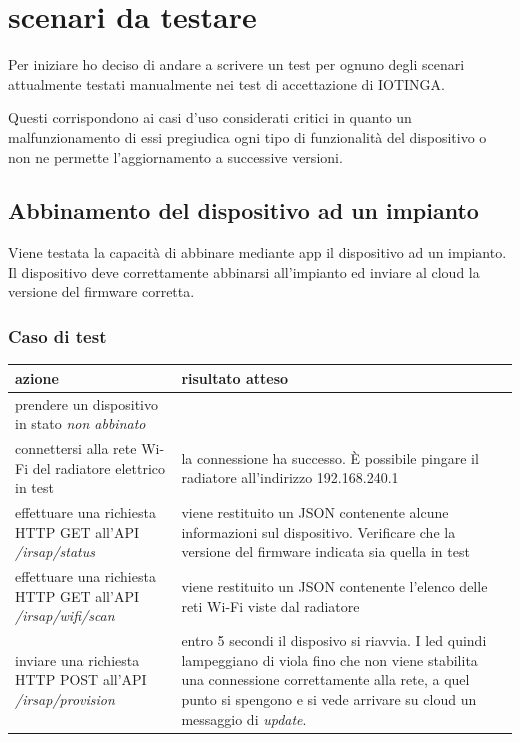 \documentclass[12pt,a4paper,twoside,titlepage]{book}
\begin{document}
\section{scenari da testare}

Per iniziare ho deciso di andare a scrivere un test per ognuno degli scenari attualmente
testati manualmente nei test di accettazione di IOTINGA.

Questi corrispondono ai casi d'uso considerati critici in quanto un malfunzionamento
di essi pregiudica ogni tipo di funzionalità del dispositivo o non ne permette l'aggiornamento
a successive versioni.

\subsection{Abbinamento del dispositivo ad un impianto}

Viene testata la capacità di abbinare mediante app il dispositivo ad un impianto.
Il dispositivo deve correttamente abbinarsi all’impianto ed inviare al cloud la versione
del firmware corretta.

\subsubsection{Caso di test}
\begin{center}
\begin{tabular}{| p{} | p{} |}
    \hline \textbf{azione} & \textbf{risultato atteso} \\
    \hline prendere un dispositivo in stato \textit{non abbinato} & \\
    \hline connettersi alla rete Wi-Fi del radiatore elettrico in test & la connessione ha successo. È possibile pingare il radiatore all'indirizzo 192.168.240.1 \\
    \hline effettuare una richiesta HTTP GET all'API \textit{/irsap/status} & viene restituito un JSON contenente alcune informazioni sul dispositivo. Verificare che la versione del firmware indicata sia quella in test \\
    \hline effettuare una richiesta HTTP GET all'API \textit{/irsap/wifi/scan} & viene restituito un JSON contenente l'elenco delle reti Wi-Fi viste dal radiatore \\
    \hline inviare una richiesta HTTP POST all'API \textit{/irsap/provision} & entro 5 secondi il disposivo si riavvia. I led quindi lampeggiano di viola fino che non viene stabilita una connessione correttamente alla rete, a quel punto si spengono e si vede arrivare su cloud un messaggio di \textit{update}. \\
    \hline
\end{tabular}
\end{center}
\end{document}
